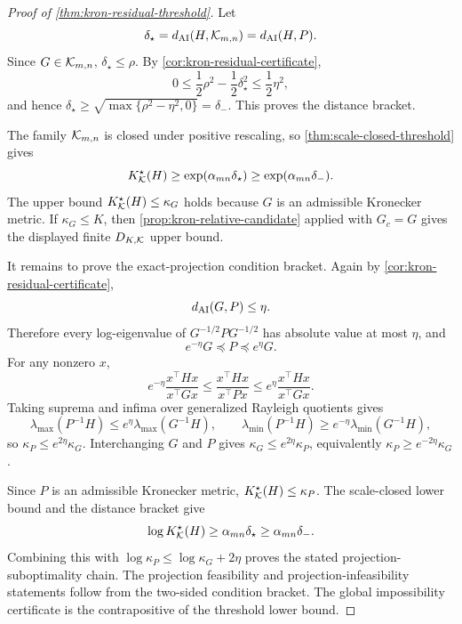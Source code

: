 \begin{proof}[Proof of \cref{thm:kron-residual-threshold}]
Let
\[
  \delta_\star=d_{\mathrm{AI}}(H,\mathcal K_{m,n})=d_{\mathrm{AI}}(H,P).
\]
Since \(G\in\mathcal K_{m,n}\), \(\delta_\star\le\rho\). By
\cref{cor:kron-residual-certificate},
\[
  0
  \le
  \frac12\rho^2-\frac12\delta_\star^2
  \le
  \frac12\eta^2,
\]
and hence \(\delta_\star\ge\sqrt{\max\{\rho^2-\eta^2,0\}}=\delta_-\). This
proves the distance bracket.

The family \(\mathcal K_{m,n}\) is closed under positive rescaling, so
\cref{thm:scale-closed-threshold} gives
\[
  K_{\mathcal K}^\star(H)
  \ge
  \exp(\alpha_{mn}\delta_\star)
  \ge
  \exp(\alpha_{mn}\delta_-).
\]
The upper bound \(K_{\mathcal K}^\star(H)\le\kappa_G\) holds because \(G\) is an
admissible Kronecker metric. If \(\kappa_G\le K\), then
\cref{prop:kron-relative-candidate} applied with \(G_c=G\) gives the displayed
finite \(D_{K,\mathcal K}\) upper bound.

It remains to prove the exact-projection condition bracket. Again by
\cref{cor:kron-residual-certificate},
\[
  d_{\mathrm{AI}}(G,P)\le\eta.
\]
Therefore every log-eigenvalue of \(G^{-1/2}PG^{-1/2}\) has absolute value at
most \(\eta\), and
\[
  e^{-\eta}G\preceq P\preceq e^\eta G.
\]
For any nonzero \(x\),
\[
  e^{-\eta}\frac{x^\top Hx}{x^\top Gx}
  \le
  \frac{x^\top Hx}{x^\top Px}
  \le
  e^\eta\frac{x^\top Hx}{x^\top Gx}.
\]
Taking suprema and infima over generalized Rayleigh quotients gives
\[
  \lambda_{\max}(P^{-1}H)\le e^\eta\lambda_{\max}(G^{-1}H),\qquad
  \lambda_{\min}(P^{-1}H)\ge e^{-\eta}\lambda_{\min}(G^{-1}H),
\]
so \(\kappa_P\le e^{2\eta}\kappa_G\). Interchanging \(G\) and \(P\) gives
\(\kappa_G\le e^{2\eta}\kappa_P\), equivalently
\(\kappa_P\ge e^{-2\eta}\kappa_G\).

Since \(P\) is an admissible Kronecker metric,
\(K_{\mathcal K}^\star(H)\le\kappa_P\).  The scale-closed lower bound and the
distance bracket give
\[
  \log K_{\mathcal K}^\star(H)
  \ge\alpha_{mn}\delta_\star
  \ge\alpha_{mn}\delta_-.
\]
Combining this with \(\log\kappa_P\le\log\kappa_G+2\eta\) proves the stated
projection-suboptimality chain.  The projection feasibility and
projection-infeasibility statements follow from the two-sided condition
bracket. The global impossibility certificate is the contrapositive of the
threshold lower bound.
\end{proof}

